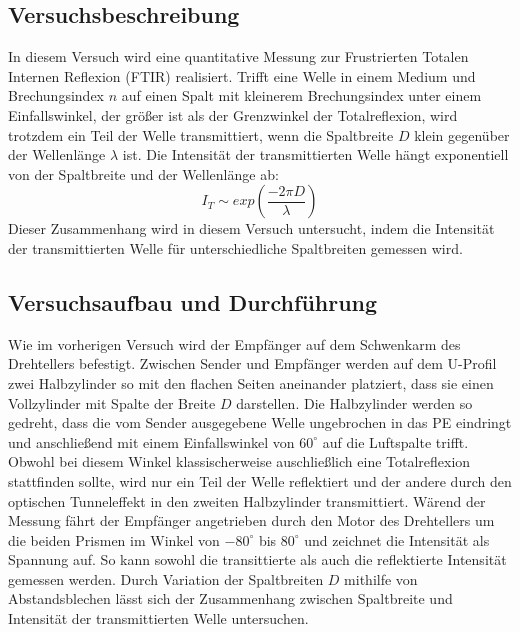 \documentclass[12pt,a4paper]{article}
\begin{document}
\subsection{Versuchsbeschreibung}
In diesem Versuch wird eine quantitative Messung zur Frustrierten Totalen Internen Reflexion (FTIR) realisiert. Trifft eine Welle in einem Medium und Brechungsindex $n$ auf einen Spalt mit kleinerem Brechungsindex unter einem Einfallswinkel, der größer ist als der Grenzwinkel der Totalreflexion, wird trotzdem ein Teil der Welle transmittiert, wenn die Spaltbreite $D$ klein gegenüber der Wellenlänge $\lambda$ ist. Die Intensität der transmittierten Welle hängt exponentiell von der Spaltbreite und der Wellenlänge ab:
\begin{equation}
I_T \sim exp(\frac{-2\pi D}{\lambda})
\end{equation}
Dieser Zusammenhang wird in diesem Versuch untersucht, indem die Intensität der transmittierten Welle für unterschiedliche Spaltbreiten gemessen wird.
\subsection{Versuchsaufbau und Durchführung}
Wie im vorherigen Versuch wird der Empfänger auf dem Schwenkarm des Drehtellers befestigt. Zwischen Sender und Empfänger werden auf dem U-Profil zwei Halbzylinder so mit den flachen Seiten aneinander platziert, dass sie einen Vollzylinder mit Spalte der Breite $D$ darstellen. Die Halbzylinder werden so gedreht, dass die vom Sender ausgegebene Welle ungebrochen in das PE eindringt und anschließend mit einem Einfallswinkel von $60^{\circ}$ auf die Luftspalte trifft. Obwohl bei diesem Winkel klassischerweise auschließlich eine Totalreflexion stattfinden sollte, wird nur ein Teil der Welle reflektiert und der andere durch den optischen Tunneleffekt in den zweiten Halbzylinder transmittiert. Wärend der Messung fährt der Empfänger angetrieben durch den Motor des Drehtellers um die beiden Prismen im Winkel von $-80^{\circ}$ bis $80^{\circ}$ und zeichnet die Intensität als Spannung auf. So kann sowohl die transittierte als auch die reflektierte Intensität gemessen werden. Durch Variation der Spaltbreiten $D$ mithilfe von Abstandsblechen lässt sich der Zusammenhang zwischen Spaltbreite und Intensität der transmittierten Welle untersuchen.
\end{document}
